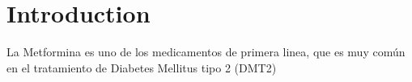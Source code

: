 \chapter{Introduction}
\label{Introduction}
La Metformina es uno de los medicamentos de primera linea, que es  muy común en el tratamiento de Diabetes Mellitus tipo 2 (DMT2) \cite{Ovens2022}